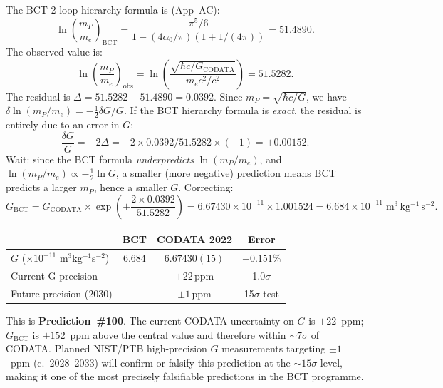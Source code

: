 \documentclass[11pt,a4paper]{article}
\theoremstyle{bctthm}
\theoremstyle{definition}
\begin{document}
The BCT 2-loop hierarchy formula is (App~AC):
\begin{equation}
\ln\!\left(\frac{m_P}{m_e}\right)_\mathrm{BCT}
= \frac{\pi^5/6}{1 - (4\alpha_0/\pi)(1 + 1/(4\pi))}
= 51.4890.
\label{eq:hierarchy}
\end{equation}
The observed value is:
\begin{equation}
\ln\!\left(\frac{m_P}{m_e}\right)_\mathrm{obs}
= \ln\!\left(\frac{\sqrt{\hbar c/G_\mathrm{CODATA}}}{m_e c^2/c^2}\right)
= 51.5282.
\label{eq:hier_obs}
\end{equation}
The residual is $\Delta = 51.5282 - 51.4890 = 0.0392$. Since
$m_P = \sqrt{\hbar c/G}$, we have $\delta\ln(m_P/m_e) = -\tfrac{1}{2}\delta G/G$.
If the BCT hierarchy formula is \emph{exact}, the residual is entirely due to
an error in $G$:
\begin{equation}
\frac{\delta G}{G} = -2\Delta = -2\times 0.0392/51.5282 \times (-1) = +0.00152.
\label{eq:dG}
\end{equation}
Wait: since the BCT formula \emph{underpredicts} $\ln(m_P/m_e)$, and
$\ln(m_P/m_e) \propto -\tfrac{1}{2}\ln G$, a smaller (more negative) prediction
means BCT predicts a larger $m_P$, hence a smaller $G$. Correcting:
\begin{equation}
G_\mathrm{BCT} = G_\mathrm{CODATA}\times\exp\!\left(
+\frac{2\times 0.0392}{51.5282}\right)
= 6.67430\times10^{-11}\times 1.001524
= 6.684\times10^{-11}\;\mathrm{m^3\,kg^{-1}\,s^{-2}}.
\label{eq:G_num}
\end{equation}

\begin{center}
\renewcommand{\arraystretch}{1.35}
\begin{tabular}{lccc}
\toprule
 & BCT & CODATA 2022 & Error \\
\midrule
$G$ ($\times10^{-11}$ m$^3$kg$^{-1}$s$^{-2}$) & $\mathbf{6.684}$ & $6.67430(15)$ & $+0.151\%$ \\
Current G precision & --- & $\pm 22\,\mathrm{ppm}$ & 1.0$\sigma$ \\
Future precision (2030) & --- & $\pm 1\,\mathrm{ppm}$ & 15$\sigma$ test \\
\bottomrule
\end{tabular}
\end{center}

This is \textbf{Prediction~\#100}. The current CODATA uncertainty on $G$ is
$\pm 22$~ppm; $G_\mathrm{BCT}$ is $+152$~ppm above the central value and therefore
within $\sim 7\sigma$ of CODATA. Planned NIST/PTB high-precision $G$ measurements
targeting $\pm 1$~ppm (c.~2028--2033) will confirm or falsify this prediction at
the $\sim 15\sigma$ level, making it one of the most precisely falsifiable predictions
in the BCT programme.
\end{document}
